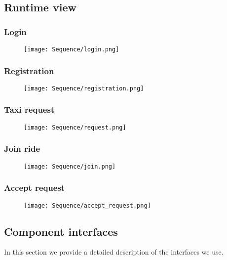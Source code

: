 \subsection{Runtime view}
	\subsubsection{Login}
	\begin{figure}[h!]
		\centering
		\texttt{[image: Sequence/login.png]}
	\end{figure}
	\newpage
	
	\subsubsection{Registration}
	\begin{figure}[h!]
		\centering
		\texttt{[image: Sequence/registration.png]}
	\end{figure}
	\newpage
	
	\subsubsection{Taxi request}
	\begin{figure}[h!]
		\centering
		\texttt{[image: Sequence/request.png]}
	\end{figure}
	\newpage
	
	\subsubsection{Join ride}
	\begin{figure}[h!]
		\centering
		\texttt{[image: Sequence/join.png]}
	\end{figure}
	\newpage		

	\subsubsection{Accept request}
	\begin{figure}[h!]
		\centering
		\texttt{[image: Sequence/accept\_request.png]}
	\end{figure}
	\newpage		


\subsection{Component interfaces}
In this section we provide a detailed description of the interfaces we use.

